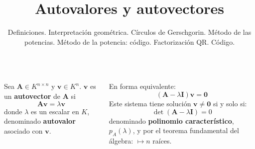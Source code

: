\documentclass[9pt, aspectratio=169]{beamer}
\title{Autovalores y autovectores}
\subtitle{Definiciones. Interpretación geométrica. Círculos de Gerschgorin. Método de las potencias. Método de la potencia: código. Factorización QR. Código.}
\begin{document}
\maketitle

\begin{frame}
\begin{columns}[t]
\cx
\begin{definition}
    Sea $\bm{A} \in K^{n \times n}$ y $\bm{v} \in K^n$. $\bm{v}$ es un \textbf{autovector} de $\bm{A}$ si 
    \[ \bm{A} \bm{v} = \lambda \bm{v} \]
    donde $\lambda$ es un escalar en $K$, denominado \textbf{autovalor} asociado con $\bm{v}$.
\end{definition}  \pause
En forma equivalente:
\begin{equation}
(\bm{A} - \lambda \bm{I}) \bm{v} = \bm{0}
\label{eq:avv01}
\end{equation}
Este sistema tiene solución $\bm{v} \neq \bm{0}$ si y solo si:
\[ \det(\bm{A} - \lambda \bm{I}) = 0 \]
denominado \textbf{polinomio característico}, $p_A(\lambda)$, y por el teorema fundamental del álgebra: $\mapsto n$ raíces.
\pause  


\end{columns}
\end{frame}
\end{document}
